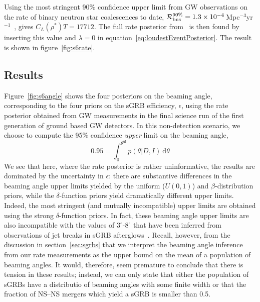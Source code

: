 \documentclass[twocolumn,nofootinbib]{revtex4-1}
\newcommand{\cbcrate}{{{\mathcal R}}}
\newcommand{\diff}{{\mathrm d}}
\newcommand{\rhostar}{{\rho^*}}
\newcommand{\BNS}{\ac{NS}--\ac{NS}\xspace}
\begin{document}
Using the most stringent 90\% confidence upper limit from \ac{GW} observations on the rate of binary neutron star coalescences to date, $\cbcrate^{90\%}_{{\rm bns}} = 1.3\times 10^{-4}$\,Mpc$^{-3}$yr$^{-1}$~\cite{S6lowmass}, gives $C_L(\rhostar)T=17712$.
The full rate posterior from~\cite{S6lowmass} is then found by inserting this value and $\lambda=0$ in equation~\ref{eq:loudestEventPosterior}.
The result is shown in figure~\ref{fig:s6rate}.



\subsection{Results}
Figure~\ref{fig:s6angle} shows the four posteriors on the beaming angle, corresponding to the four priors on the \ac{sGRB} efficiency, $\epsilon$, using the rate posterior obtained from \ac{GW} measurements in the final science run of the first generation of ground based \ac{GW} detectors.
In this non-detection scenario, we choose to compute the 95\% confidence \emph{upper} limit on the beaming angle,
\begin{equation}
    \label{eq:beaming_upper_limit}
    0.95 = \int_0^{\theta^{\mathrm{ul}}} p(\theta|D,I)~\diff \theta
\end{equation}
%
We see that here, where the rate posterior is rather uninformative, the results are dominated by the uncertainty in $\epsilon$: there are substantive differences in the beaming angle upper limits yielded by the uniform ($U(0,1)$) and $\beta$-distribution priors, while the $\delta$-function priors yield dramatically different upper limits.
Indeed, the most stringent (and mutually incompatible) upper limits are obtained using the strong $\delta$-function priors.
In fact, these beaming angle upper limits are also incompatible with the values of $3^{\circ}\mbox{-}8^{\circ}$ that have been inferred from observations of jet breaks in \ac{sGRB} afterglows~\cite{Fong:2013lba,2006MNRAS.367L..42P, 2012A&A...538L...7N}.
Recall, however, from the discussion in section~\ref{sec:sgrbs} that we interpret the beaming angle inference from our rate measurements as the upper bound on the mean of a population of beaming angles.
It would, therefore, seem premature to conclude that there is tension in these results; instead, we can only state that either the population of \acp{sGRB} have a distributio of beaming angles with some finite width or that the fraction of \BNS mergers which yield a \ac{sGRB} is smaller than 0.5.
\end{document}
